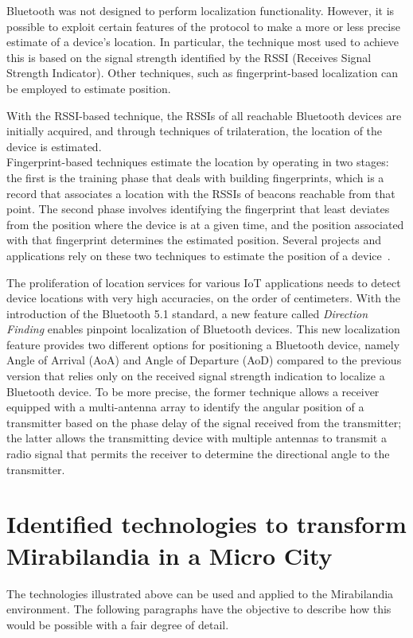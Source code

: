 Bluetooth was not designed to perform localization functionality. However, it is possible to exploit certain features of the protocol to make a more
or less precise estimate of a device's location. In particular, the technique most used to achieve this is based on the signal strength identified by
the RSSI (Receives Signal Strength Indicator). Other techniques, such as fingerprint-based localization can be employed to estimate position.

With the RSSI-based technique, the RSSIs of all reachable Bluetooth devices are initially acquired, and through techniques of trilateration, the
location of the device is estimated.\\ Fingerprint-based techniques estimate the location by operating in two stages: the first is the training phase
that deals with building fingerprints, which is a record that associates a location with the RSSIs of beacons reachable from that point. The second
phase involves identifying the fingerprint that least deviates from the position where the device is at a given time, and the position associated
with that fingerprint determines the estimated position. Several projects and applications rely on these two techniques to estimate the position of a
device~\cite{mcconville2021vesta, samuel2021smart}.

The proliferation of location services for various IoT applications needs to detect device locations with very high accuracies, on the order of
centimeters. With the introduction of the Bluetooth 5.1 standard, a new feature called \textit{Direction Finding} enables pinpoint localization of
Bluetooth devices. This new localization feature provides two different options for positioning a Bluetooth device, namely Angle of Arrival (AoA) and
Angle of Departure (AoD) compared to the previous version that relies only on the received signal strength indication to localize a Bluetooth device.
To be more precise, the former technique allows a receiver equipped with a multi-antenna array to identify the angular position of a transmitter
based on the phase delay of the signal received from the transmitter; the latter allows the transmitting device with multiple antennas to transmit a
radio signal that permits the receiver to determine the directional angle to the transmitter.

\section{Identified technologies to transform Mirabilandia in a Micro City}
The technologies illustrated above can be used and applied to the Mirabilandia environment.
The following paragraphs have the objective to describe how this would be possible with a fair degree of detail.
